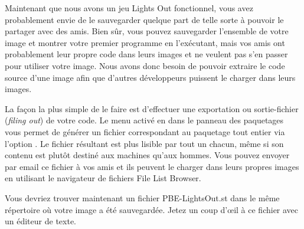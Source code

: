 \documentclass[a4paper,10pt,twoside]{book}
\begin{document}
Maintenant que nous avons un jeu Lights Out fonctionnel, vous avez
probablement envie de le sauvegarder quelque part de telle sorte à
pouvoir le partager avec des amis. Bien sûr, vous pouvez sauvegarder
l'ensemble de votre image \pharo et montrer votre premier programme
en l'exécutant, mais vos amis ont probablement leur propre code dans
leurs images et ne veulent pas s'en passer pour utiliser votre image.
Nous avons donc besoin de pouvoir extraire le code source d'une image
\pharo afin que d'autres développeurs puissent le charger dans leurs images.

La façon la plus simple de le faire est d'effectuer une exportation ou
sortie-fichier (\emph{filing out}) de votre code. 
Le menu activé en \actclickant{} dans le panneau des paquetages vous permet de
générer un fichier correspondant au paquetage  tout entier 
via l'option .
Le fichier résultant est plus lisible par tout un chacun, même si son
contenu est plutôt destiné aux machines qu'aux hommes.
Vous pouvez envoyer par email ce fichier à vos amis et ils peuvent le
charger dans leurs propres images \pharo en utilisant le navigateur
de fichiers File List Browser.

Vous devriez trouver maintenant un fichier PBE-LightsOut.st dans le même
répertoire où votre image a été sauvegardée.
Jetez un coup d'\oe il à ce fichier avec un éditeur de texte.



\end{document}
